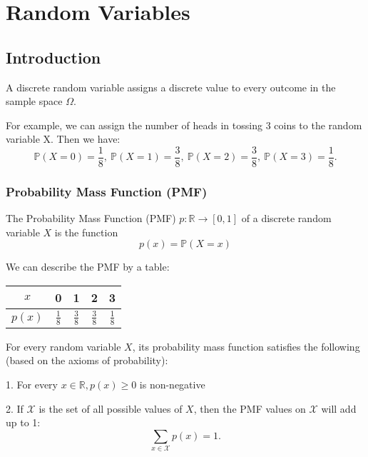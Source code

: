 \chapter{Random Variables}

\section{Introduction}
\begin{definition}
    A discrete random variable assigns a discrete value to every outcome in the sample space \(\Omega\). 
\end{definition}

For example, we can assign the number of heads in tossing 3 coins to the random variable X. Then we have: 
\[
  \mathbb{P}(X = 0) = \dfrac{1}{8},\ \mathbb{P}(X = 1) = \dfrac{3}{8},\ \mathbb{P}(X = 2) = \dfrac{3}{8},\ \mathbb{P}(X = 3) = \dfrac{1}{8}.
\]

\subsection{Probability Mass Function (PMF)}
\begin{definition}
  The Probability Mass Function (PMF) \(p: \mathbb{R} \to [0, 1]\) of a discrete random variable \(X\) is the function 
  \[
    p(x) = \mathbb{P}(X = x)
  \]
\end{definition}

We can describe the PMF by a table:
\begin{table}[H]
    \centering
    \begin{tabular}{c|c|c|c|c}
        \(x\)  & 0 & 1 & 2 & 3  \\
      \midrule
        \(p(x)\)  & \(\frac{1}{8}\) & \(\frac{3}{8}\) & \(\frac{3}{8}\) & \(\frac{1}{8}\)  \\
    \end{tabular}
\end{table}

For every random variable \(X\), its probability mass function satisfies the following (based on the axioms of probability):

1. For every \(x \in \mathbb{R}, p(x) \geq 0\) is non-negative

2. If \(\mathcal{X}\) is the set of all possible values of \(X\), then the PMF values on \(\mathcal{X}\) will add up to 1:
\[
  \sum_{x \in \mathcal{X}} p(x) = 1. 
\]

